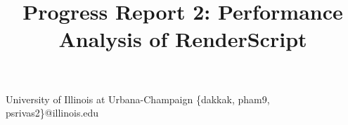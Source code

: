 \documentclass[nocopyrightspace]{sigplanconf}
\begin{document}

\title{Progress Report 2: Performance Analysis of RenderScript}

           {University of Illinois at Urbana-Champaign}
           {\{dakkak, pham9, psrivas2\}@illinois.edu}


\maketitle












% 
% 


%
%
\end{document}

